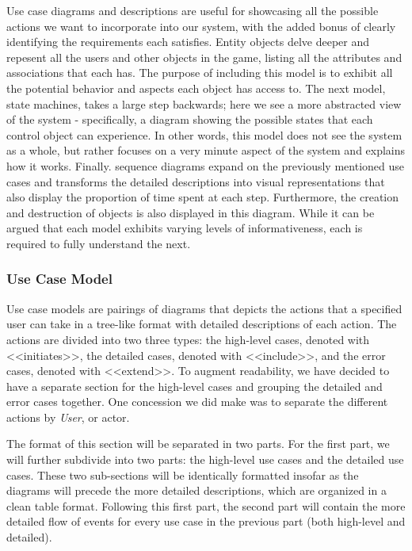 \documentclass[12pt,letterpaper]{article}
\begin{document}
Use case diagrams and descriptions are useful for showcasing all the possible actions we want to incorporate into our system, with the added bonus of clearly
identifying the requirements each satisfies. Entity objects delve deeper and repesent all the users and other objects in the game, listing all the attributes and associations
that each has. The purpose of including this model is to exhibit all the potential behavior and aspects each object has access to. The next model, state machines, takes a large
step backwards; here we see a more abstracted view of the system - specifically, a diagram showing the possible states that each control object can experience. In other words, this
model does not see the system as a whole, but rather focuses on a very minute aspect of the system and explains how it works. Finally. sequence diagrams
expand on the previously mentioned use cases and transforms the detailed descriptions into visual representations that also display the proportion of time spent
at each step. Furthermore, the creation and destruction of objects is also displayed in this diagram. While it can be argued that each model exhibits varying levels
of informativeness, each is required to fully understand the next.

\subsubsection{Use Case Model}

Use case models are pairings of diagrams that depicts the actions that a specified user can take in a tree-like format with detailed descriptions of each action. The actions 
are divided into two three types: the high-level cases, denoted with <<initiates>>, the detailed cases, denoted with <<include>>, and the error cases, denoted with 
<<extend>>. To augment readability, we have decided to have a separate section for the high-level cases and grouping the detailed and error cases together. One 
concession we did make was to separate the different actions by {\it User}, or actor. 

The format of this section will be separated in two parts. For the first part, we will further subdivide into two parts: the high-level use cases and the detailed use cases. 
These two sub-sections will be identically formatted insofar as the diagrams will precede the more detailed descriptions, which are organized in a clean table format. Following
this first part, the second part will contain the more detailed flow of events for every use case in the previous part (both high-level and detailed).
\end{document}
